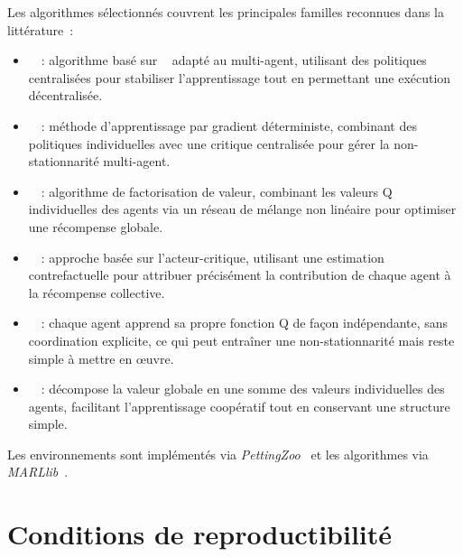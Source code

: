 \medskip

Les algorithmes  sélectionnés couvrent les principales familles reconnues dans la littérature~:
\begin{itemize}
  \item {}~\cite{Yu2022}~: algorithme basé sur ~\cite{Schulman2017} adapté au multi-agent, utilisant des politiques centralisées pour stabiliser l'apprentissage tout en permettant une exécution décentralisée.
  \item {}~\cite{lowe2017multi}~: méthode d'apprentissage par gradient déterministe, combinant des politiques individuelles avec une critique centralisée pour gérer la non-stationnarité multi-agent.
  \item {}~\cite{rashid2018qmix}~: algorithme de factorisation de valeur, combinant les valeurs Q individuelles des agents via un réseau de mélange non linéaire pour optimiser une récompense globale.
  \item {}~\cite{foerster2018counterfactual}~: approche basée sur l'acteur-critique, utilisant une estimation contrefactuelle pour attribuer précisément la contribution de chaque agent à la récompense collective.
  \item {}~\cite{Jiang2022}~: chaque agent apprend sa propre fonction Q de façon indépendante, sans coordination explicite, ce qui peut entraîner une non-stationnarité mais reste simple à mettre en œuvre.
  \item {}~\cite{sunehag2018value}~: décompose la valeur globale en une somme des valeurs individuelles des agents, facilitant l'apprentissage coopératif tout en conservant une structure simple.
\end{itemize}
Les environnements sont implémentés via \textit{PettingZoo}~\cite{terry2020pettingzoo} et les algorithmes via \textit{MARLlib}~\cite{hu2022marllib}.

\section{Conditions de reproductibilité}

